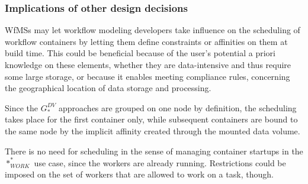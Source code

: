   \subsubsection{Implications of other design decisions} %
  \label{ssub:implications_of_other_design_decisions}
    \acp{WfMS} may let workflow modeling developers take influence on the scheduling of workflow containers by letting them define constraints or affinities on them at build time. This could be beneficial because of the user's potential a priori knowledge on these elements, \eg whether they are data-intensive and thus require some large storage, or because it enables meeting compliance rules, \eg concerning the geographical location of data storage and processing.

    Since the $G_{*}^{DV}$ approaches are grouped on one node by definition, the scheduling takes place for the first container only, while subsequent containers are bound to the same node by the implicit affinity created through the mounted data volume.

    There is no need for scheduling in the sense of managing container startups in the $*_{WORK}^{*}$ use case, since the workers are already running. Restrictions could be imposed on the set of workers that are allowed to work on a task, though.
